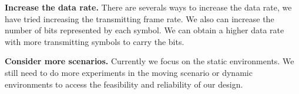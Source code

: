 \textbf{Increase the data rate.} There are severals ways to increase the data rate, we have tried increasing the transmitting frame rate. We also can increase the number of bits represented by each symbol. We can obtain a higher data rate with more transmitting symbols to carry the bits.

\textbf{Consider more scenarios.} Currently we focus on the static environments. We still need to do more experiments in the moving scenario or dynamic environments to access the feasibility and reliability of our design.